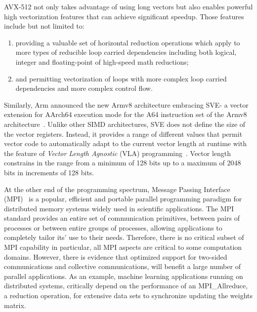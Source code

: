 \documentclass[5p,times,twocolumn]{elsarticle}
\newcommand{\mpi}[0]{\textsc{MPI}\xspace}
\newcommand{\arm}[0]{Arm\xspace}
\newcommand{\sve}[0]{\textsc{SVE}\xspace}
\begin{document}
AVX-512 not only takes advantage of using long vectors but also enables powerful high
vectorization features that can achieve significant speedup. Those features
include but not limited to:
\begin{enumerate}
  \item providing a valuable set of horizontal reduction operations which apply to more
  types of reducible loop carried dependencies including both logical, integer
  and floating-point of high-speed math reductions;
  \item and permitting vectorization of loops with more complex loop carried dependencies and more complex control flow.
\end{enumerate}

Similarly, \arm announced the new Armv8 architecture embracing \sve - a vector extension for AArch64
execution mode for the A64 instruction set of the
Armv8 architecture~\cite{arm-v8-ref, ARMv8-Architecture}.
Unlike other SIMD architectures, \sve does not define the size of
the vector registers. Instead, it provides a range of different values that permit vector
code to automatically adapt to the current vector length at runtime with the
feature of \emph{Vector Length Agnostic} (VLA) programming~\cite{Advanced-SIMD,vla-stencil}.
Vector length constrains in the range from a minimum of 128 bits up to
a maximum of 2048 bits in increments of 128 bits.

At the other end of the programming spectrum, Message Passing Interface
(\mpi)~\cite{mpi-forum} is a popular, efficient and portable parallel programming
paradigm for distributed memory systems widely used in scientific applications.
The MPI standard provides an entire set of communication primitives, between pairs of processes or between entire groups of processes, allowing applications to completely tailor its' use to their needs.
%
Therefore, there is no critical subset of MPI capability in particular, all MPI aspects are critical to some computation domains.
However, there is evidence that optimized support for two-sided communications and collective communications, will benefit a large number of parallel applications. As an example, machine learning applications running on distributed systems,
critically depend on the performance of an MPI\_Allreduce, a reduction operation,
for extensive data sets to synchronize updating the weights matrix.
\end{document}
